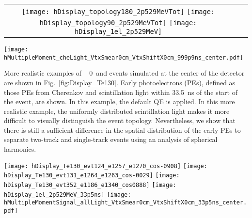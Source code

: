 \begin{figure*}[h]
  \centering
  \begin{tabular}{c c c}
  \texttt{[image: hDisplay\_topology180\_2p529MeVTot]}
  \texttt{[image: hDisplay\_topology90\_2p529MeVTot]}
  \texttt{[image: hDisplay\_1el\_2p529MeV]}
  \end{tabular}
  \texttt{[image: hMultipleMoment\_cheLight\_VtxSmear0cm\_VtxShiftX0cm\_999p9ns\_center.pdf]}

  \caption{Cherenkov photons distributions on the detector sphere for
    the three representative event topologies: two back-to-back 1.26~MeV
    electrons (\emph{left}), two 1.26~MeV electrons at 90$^{\circ}$
    angle (\emph{middle}), and a single 2.529~MeV electron
    (\emph{center}).  All electrons originate at the center of the
    detector. One randomly selected event is chosen for each
    category. Default QE is applied.}
  \label{fig:Display_top_2p5MeV}
\end{figure*}

More realistic examples of \Te~ 0\nbb~and \B events simulated at the center of the detector are shown in Fig.~\ref{fig:Display_Te130}. Early photoelectrons (PEs), defined as those PEs from Cherenkov and scintillation light within 33.5~ns of the start of the event, are shown. In this example, the default QE is applied.  In this more realistic example, the uniformly distributed scintillation light makes it more difficult to visually distinguish the event topology. Nevertheless, we show that there is still a sufficient difference in the spatial distribution of the early PEs to separate two-track and single-track events using an analysis of spherical harmonics.

\begin{figure*}[h]
  \centering
  \texttt{[image: hDisplay\_Te130\_evt124\_e1257\_e1270\_cos-0908]}
  \texttt{[image: hDisplay\_Te130\_evt131\_e1264\_e1263\_cos-0029]}
  \texttt{[image: hDisplay\_Te130\_evt352\_e1186\_e1340\_cos0888]}
  \texttt{[image: hDisplay\_1el\_2p529MeV\_33p5ns]}
  \texttt{[image: hMultipleMomentSignal\_allLight\_VtxSmear0cm\_VtxShiftX0cm\_33p5ns\_center.pdf]} 
  \caption{Examples of PEs position on the detector sphere after time
    cut of 33.5ns. PEs from Cherenkov (\emph{red}) and scintillation
    light (\emph{blue}) are compared. \emph{Top left:} $^{130}$Te
    0{\nbb} decay back-to-back electrons: $E_1$=1.257~MeV,
    $E_2$=1.270~MeV, cos($\theta$)=-0.908. \emph{Top right:}
    $^{130}$Te 0{\nbb} decay electrons at $\sim$90$^{\circ}$:
    $E_1$=1.264~MeV, $E_2$=1.263~MeV,
    cos($\theta$)=-0.029. \emph{Bottom left:} $^{130}$Te 0{\nbb} decay
    electrons at $\sim$0$^{\circ}$: $E_1$=1.186~MeV, $E_2$=1.340~MeV,
    cos($\theta$)=0.888. \emph{Bottom right:} 2.529~MeV single
    electron. Events are simulated at the center of the
    detector. Default QE is applied.}
\label{fig:Display_Te130}
\end{figure*}

